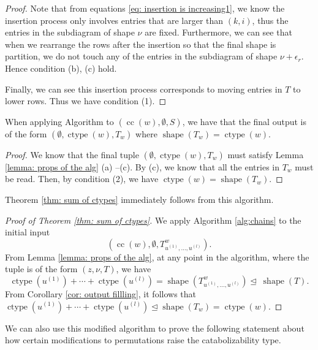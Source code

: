 \documentclass[ALCO, Unicode]{cedram}
\DeclareMathOperator{\ctype}{ctype}
\DeclareMathOperator{\shape}{shape}
\DeclareMathOperator{\cc}{cc}
\begin{document}
\begin{proof}
   Note that from equations \eqref{eq: insertion is increasing1}, we know the insertion process only involves entries that are larger than $(k,i)$, thus the entries in the subdiagram of shape $\nu$ are fixed. 
   Furthermore, we can see that when we rearrange the rows after the insertion so that the final shape is partition, we do not touch any of the entries in the subdiagram of shape $\nu+\epsilon_r$. Hence condition (b), (c) hold.

Finally, we can see this insertion process corresponds to moving entries in $T$ to lower rows. Thus we have condition (1).


    \end{proof}

\begin{coro}\label{cor: output fillling}
   When applying Algorithm to $(\cc(w), \emptyset, S)$, we have that the final output is of the form $(\emptyset, \ctype(w), T_w) $ where  $\shape(T_w) = \ctype(w)$.
\end{coro}
\begin{proof}
We know that the final tuple $(\emptyset, \ctype(w), T_w) $ must satisfy Lemma \ref{lemma: props of the alg} (a) --(c).
By (c), we know that all the entries in $T_w$ must be read. Then, by condition (2), we have $\ctype(w) = \shape(T_w)$.
\end{proof}


    
Theorem \ref{thm: sum of ctypes} immediately follows from this algorithm.
\begin{proof}[Proof of Theorem \ref{thm: sum of ctypes}] 
We apply Algorithm \ref{alg:chains} to the initial input \[(\cc(w), \emptyset, T^w_{u^{(1)}, \dots, u^{(l)}}).\]
From Lemma \ref{lemma: props of the alg}, at any point in the algorithm,  where the tuple is of the form $(z,\nu,T)$, we have  \[\ctype(u^{(1)}) + \cdots +\ctype(u^{(l)})  = \shape (T^w_{u^{(1)},\dots,  u^{(l)}}) \unlhd \ \shape(T).\] From Corollary \ref{cor: output fillling}, it follows that $\ctype(u^{(1)}) + \cdots+ \ctype( u^{(l)})\unlhd \shape (T_w) = \ctype(w)$.    
\end{proof}



    We can also use this modified algorithm to prove the following statement about how certain modifications to permutations raise the catabolizability type.
    
\end{document}
